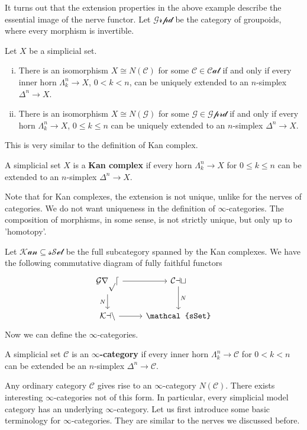 It turns out that the extension properties in the above example describe the essential image of the nerve functor. Let \(\mathcal{Grpd}\) be the category of groupoids, where every morphism is invertible.
\begin{proposition}
    Let \(X\) be a simplicial set.
    \begin{enumerate}[(i)]
        \item There is an isomorphism \(X\cong N(\mathcal{C})\) for some \(\mathcal{C}\in \mathcal{Cat}\) if and only if every inner horn \(\Lambda^n_k\rightarrow X\), \(0<k<n\), can be uniquely extended to an \(n\)-simplex \(\Delta^n\rightarrow X\).
        \item There is an isomorphism \(X\cong N(\mathcal{G})\) for some \(\mathcal{G}\in \mathcal{Gprd}\) if and only if every horn \(\Lambda^n_k\rightarrow X\), \(0\leq k\leq n\) can be uniquely extended to an \(n\)-simplex \(\Delta^n\rightarrow X\).
    \end{enumerate}
\end{proposition}
This is very similar to the definition of Kan complex.
\begin{definition}
    A simplicial set \(X\) is a \textbf{Kan complex} if every horn \(\Lambda^n_k\rightarrow X\) for \(0\leq k\leq n\) can be extended to an \(n\)-simplex \(\Delta^n\rightarrow X\).
\end{definition}
\begin{remark}
    Note that for Kan complexes, the extension is not unique, unlike for the nerves of categories. We do not want uniqueness in the definition of \(\infty\)-categories. The composition of morphisms, in some sense, is not strictly unique, but only up to 'homotopy'.
\end{remark}
Let \(\mathcal{Kan}\subseteq \mathcal{sSet}\) be the full subcategory spanned by the Kan complexes. We have the following commutative diagram of fully faithful functors
\[\begin{tikzcd}
        {\mathcal{Grpd}} & {\mathcal{Cat}} \\
        {\mathcal{Kan}} & {\mathcal{sSet}}
        \arrow[from=1-1, to=1-2]
        \arrow["N"', from=1-1, to=2-1]
        \arrow["N", from=1-2, to=2-2]
        \arrow[from=2-1, to=2-2]
    \end{tikzcd}\]
Now we can define the \(\infty\)-categories.
\begin{definition}
    A simplicial set \(\mathcal{C}\) is an \textbf{\(\infty\)-category} if every inner horn \(\Lambda^n_k\rightarrow \mathcal{C}\) for \(0<k<n\) can be extended be an \(n\)-simplex \(\Delta^n\rightarrow \mathcal{C}\).
\end{definition}
Any ordinary category \(\mathcal{C}\) gives rise to an \(\infty\)-category \(N(\mathcal{C})\). There exists interesting \(\infty\)-categories not of this form. In particular, every simplicial model category has an underlying \(\infty\)-category. Let us first introduce some basic terminology for \(\infty\)-categories. They are similar to the nerves we discussed before.

